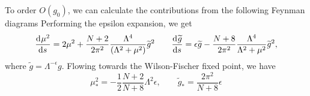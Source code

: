 To order $O(g_0)$, we can calculate the contributions from the following Feynman diagrams
Performing the epsilon expansion, we get
\begin{equation}
  \dv[]{\mu^2}{s} = 2\mu^2 + \frac{N + 2}{2\pi^2} \frac{\Lambda^4}{(\Lambda^2 + \mu^2)} \widetilde{g}^2 \qquad \dv[]{\widetilde{g}}{s} = \epsilon \widetilde{g} - \frac{N + 8}{2\pi^2} \frac{\Lambda^4}{\Lambda^2 + \mu^2} \widetilde{g}^2,
\end{equation}
where $\widetilde{g} = \Lambda^{-\epsilon} g$.
Flowing towards the Wilson-Fischer fixed point, we have
\begin{equation}
  \mu_*^2 = -\frac{1}{2} \frac{N + 2}{N + 8} \Lambda^2 \epsilon, \qquad \widetilde{g}_* = \frac{2\pi^2}{N + 8} \epsilon
\end{equation}
